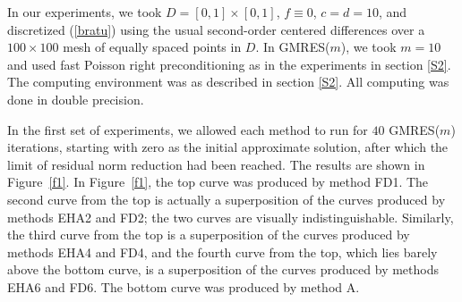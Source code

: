 \documentclass[final,leqno,onetabnum]{siamltex0315}
\def\gmres{{GMRES}}
\def\gmresm{{\rm GMRES($m$)}}
\begin{document}
In our experiments, we took $D = [0,1]\times[0,1]$, $f \equiv0$, 
$c=d=10$, and discretized (\ref{bratu}) using the usual second-order 
centered differences over a $100\times100$ mesh of equally 
spaced points in $D$. In \gmres($m$), we took $m=10$ and used fast  
Poisson right preconditioning as in the experiments in section \ref{S2}. The computing  
environment was as described in section \ref{S2}. All computing was done  
in double precision.  
 
 

In the first set of experiments, we allowed each method to  
run for $40$ {\gmresm} iterations, starting with zero as the initial  
approximate solution, after which the limit of residual norm  
reduction had been reached. The results are shown in Figure~\ref{f1}.  
In Figure~\ref{f1}, the top curve was produced by method FD1. 
The second curve from the top is actually a superposition of  
the curves produced by methods EHA2 and FD2; the two curves are 
visually indistinguishable. Similarly, the third curve from  
the top is a superposition of the curves produced by methods EHA4 
and FD4, and the fourth curve from the top, which lies barely above  
the bottom curve, is a superposition of the curves produced by  
methods EHA6 and FD6. The bottom curve was produced by method A. 
\end{document}
